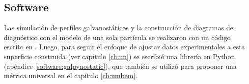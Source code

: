 \subsection{Software}

Las simulación de perfiles galvanostáticos y la construcción de diagramas de 
diagnóstico con el modelo de una sola partícula se realizaron con un código 
escrito en . Luego, para seguir el enfoque de ajustar datos 
experimentales a esta superficie construida (ver capítulo \ref{ch:un}) se 
escribió una librería en Python (apéndice \ref{software:galpynostatic}), que 
también se utilizó para proponer una métrica universal en el capítulo 
\ref{ch:umbem}.
